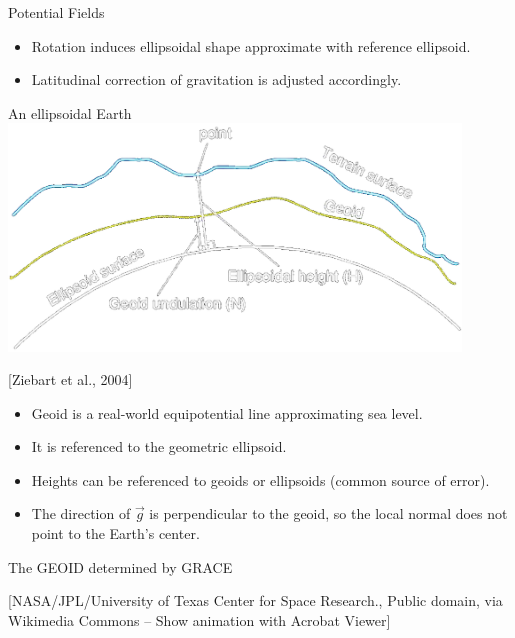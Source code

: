 \begin{frame}
\begin{PointSix}{Potential Fields}
  \begin{itemize}
    \item Rotation induces ellipsoidal shape approximate with reference ellipsoid.
    \item Latitudinal correction of gravitation is adjusted accordingly.
  \end{itemize}
\end{PointSix}
\end{frame}


\begin{frame}
  \begin{PointSix}{An ellipsoidal Earth}
      \includegraphics[width=0.9\textwidth]{Figures/Gravity/Exported/Geoid_Ziebart2004_TransparentBlack.png}

      \tiny [Ziebart et al., 2004] 

      \small
      {
        \begin{itemize}
          \item Geoid is a real-world equipotential line approximating sea level.
          \item It is referenced to the geometric ellipsoid.
        \end{itemize}
      }
      {
        \begin{itemize}
          \item Heights can be referenced to geoids or ellipsoids (common source of error).
          \item The direction of $\vec{g}$ is perpendicular to the geoid, so the local normal does not point to the Earth's center.
        \end{itemize}
      }
  \end{PointSix}
  \end{frame}


\begin{frame}
\begin{PointSix}{The GEOID determined by GRACE}
  \begin{center}
  \end{center}
  \tiny [NASA/JPL/University of Texas Center for Space Research., Public domain, via Wikimedia Commons -- Show animation with Acrobat Viewer]
\end{PointSix}
\end{frame}



